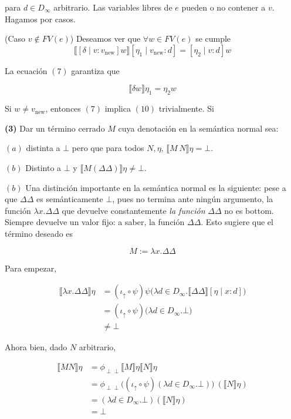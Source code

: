 \documentclass[article, 12pt]{article}
\newcommand{\ind}{\perp\!\!\!\perp}
\begin{document}
para $d \in D_\infty$ arbitrario. Las variables libres de $e$ pueden o no
contener a $v$. Hagamos por casos.

(Caso $v \not\in FV(e)$) Deseamos ver que $\forall w \in FV(e)$ se cumple
\begin{equation}
  \llbracket [ \delta \mid v: v_{\text{new}} ] w \rrbracket[\eta_1 \mid v_{\text{new}} : d] = [\eta_2 \mid v
: d] w
\end{equation}

La ecuación $(7)$ garantiza que 

\begin{equation*}
  \llbracket \delta w \rrbracket\eta_1 = \eta_2 w
\end{equation*}

Si $w \neq v_{\text{new}}$, entonces $(7)$ implica $(10)$ trivialmente. Si

\pagebreak 

\begin{myframe}
  \textbf{(3)} Dar un término cerrado $M$ cuya denotación en la semántica normal sea: 

  $(a)$ distinta a $\bot$ pero que para todos $N, \eta$, $\llbracket M ~ N
  \rrbracket\eta = \bot $.

  $(b)$ Distinto a $\bot $ y $\llbracket M(\Delta \Delta) \rrbracket\eta \neq
  \bot $.
\end{myframe}

$(b)$ Una distinción importante en la semántica normal es la siguiente: pese a que $\Delta
\Delta$ es semánticamente $\bot $, pues no termina ante ningún argumento, la
función $\lambda x. \Delta \Delta$ que devuelve constantemente \textit{la
función} $\Delta \Delta$ no es bottom. Siempre devuelve un valor fijo: a saber,
la función $\Delta \Delta$. Esto sugiere que el término deseado es

$$M := \lambda x.\Delta \Delta$$

Para empezar,

\begin{align*}
  \llbracket \lambda x.\Delta \Delta \rrbracket\eta 
  &= (\iota_\uparrow \circ \psi)\psi \big( \lambda d \in D_\infty.\llbracket \Delta \Delta \rrbracket[\eta
  \mid x : d] \big) \\ 
  &= (\iota_\uparrow \circ \psi) \big( \lambda d \in D_\infty.\bot \big) \\ 
  &\neq \bot 
\end{align*}

Ahora bien, dado $N$ arbitrario, 

\begin{align*}
  \llbracket M N \rrbracket \eta 
  &= \phi_{\ind} \llbracket M \rrbracket\eta \llbracket N \rrbracket\eta \\ 
  &= \phi_{\ind} \Big( (\iota_{\uparrow} \circ \psi)(\lambda d \in D_\infty.
  \bot ) \Big) ~ \left(  \llbracket N \rrbracket\eta \right)  \\ 
  &= (\lambda d \in D_\infty.\bot )(\llbracket N \rrbracket\eta) \\ 
  &= \bot 
\end{align*}
\end{document}
